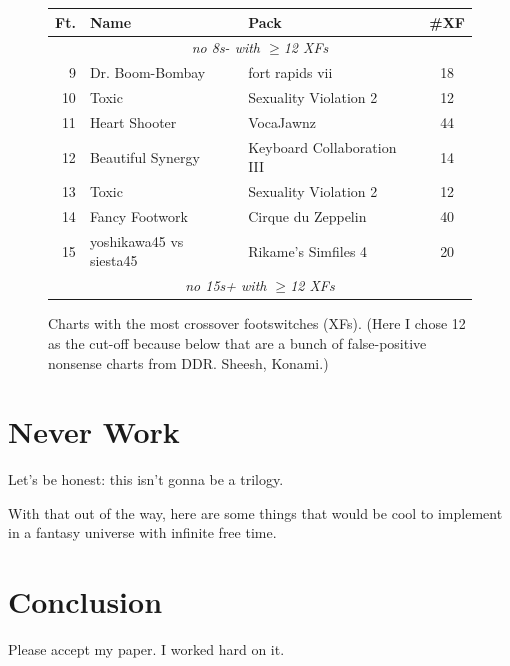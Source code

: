\documentclass[10pt]{sigplanconf}
\begin{document}
\begin{figure}[t]
	\begin{center}
		\small
	\begin{tabular}{r|l|l|c}
		\bf Ft. & \bf Name & \bf Pack & \bf \#XF \\
		\hline
		\multicolumn{4}{c}{\em no 8s- with $\ge$12 XFs} \\
		 9 & Dr. Boom-Bombay   & fort rapids vii            & 18 \\
		10 & Toxic             & Sexuality Violation 2      & 12 \\
		11 & Heart Shooter     & VocaJawnz                  & 44 \\
		12 & Beautiful Synergy & Keyboard Collaboration III & 14 \\
		13 & Toxic             & Sexuality Violation 2      & 12 \\
		14 & Fancy Footwork    & Cirque du Zeppelin         & 40 \\
		15 & yoshikawa45 vs siesta45 & Rikame's Simfiles 4  & 20 \\
		\multicolumn{4}{c}{\em no 15s+ with $\ge$12 XFs} \\
	\end{tabular}
	\end{center}
	\caption{Charts with the most crossover footswitches (XFs). (Here I chose 12 as the cut-off because below that are a bunch of false-positive nonsense charts from DDR. Sheesh, Konami.)}
\end{figure}


\section{Never Work}

Let's be honest: this isn't gonna be a trilogy.

With that out of the way, here are some things that would be cool to implement in a fantasy universe with infinite free time.


\section{Conclusion}

Please accept my paper.
I worked hard on it.




\end{document}
